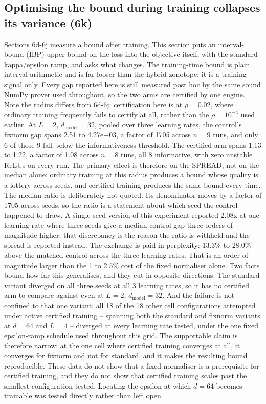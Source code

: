 \documentclass[sn-nature,pdflatex]{sn-jnl}
\begin{document}
\subsection{Optimising the bound during training collapses its variance (6k)}
Sections 6d-6j measure a bound after training. This section puts an interval-bound (IBP) upper bound on the loss into the objective itself, with the standard kappa/epsilon ramp, and asks what changes. The training-time bound is plain interval arithmetic and is far looser than the hybrid zonotope; it is a training signal only. Every gap reported here is still measured post hoc by the same sound NumPy prover used throughout, so the two arms are certified by one engine. Note the radius differs from 6d-6j: certification here is at $\rho=0.02$, where ordinary training frequently fails to certify at all, rather than the $\rho=10^{-4}$ used earlier.
At $L=2$, $d_{\text{model}}=32$, pooled over three learning rates, the control's fixnorm gap spans 2.51 to 4.27e+03, a factor of 1705 across $n=9$ runs, and only 6 of those 9 fall below the informativeness threshold. The certified arm spans 1.13 to 1.22, a factor of 1.08 across $n=8$ runs, all 8 informative, with zero unstable ReLUs on every run. The primary effect is therefore on the SPREAD, not on the median alone: ordinary training at this radius produces a bound whose quality is a lottery across seeds, and certified training produces the same bound every time.
The median ratio is deliberately not quoted. Its denominator moves by a factor of 1705 across seeds, so the ratio is a statement about which seed the control happened to draw. A single-seed version of this experiment reported 2.08x at one learning rate where three seeds give a median control gap three orders of magnitude higher; that discrepancy is the reason the ratio is withheld and the spread is reported instead.
The exchange is paid in perplexity: 13.3\% to 28.0\% above the matched control across the three learning rates. That is an order of magnitude larger than the 1 to 2.5\% cost of the fixed normaliser alone.
Two facts bound how far this generalises, and they cut in opposite directions. The standard variant diverged on all three seeds at all 3 learning rates, so it has no certified arm to compare against even at $L=2$, $d_{\text{model}}=32$. And the failure is not confined to that one variant: all 18 of the 18 other cell configurations attempted under active certified training -- spanning both the standard and fixnorm variants at $d=64$ and $L=4$ -- diverged at every learning rate tested, under the one fixed epsilon-ramp schedule used throughout this grid. The supportable claim is therefore narrow: at the one cell where certified training converges at all, it converges for fixnorm and not for standard, and it makes the resulting bound reproducible. These data do not show that a fixed normaliser is a prerequisite for certified training, and they do not show that certified training scales past the smallest configuration tested. Locating the epsilon at which $d=64$ becomes trainable was tested directly rather than left open.
\end{document}
